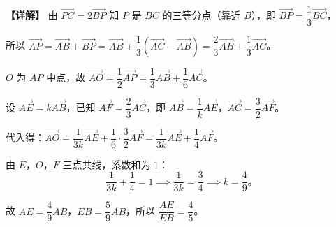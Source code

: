 \documentclass[UTF8,10pt,aspectratio=169]{ctexbeamer}
\begin{document}
	\begin{frame}
		\textbf{【详解】} 由 $\overrightarrow{PC} = 2\overrightarrow{BP}$ 知 $P$ 是 $BC$ 的三等分点（靠近 $B$），即 $\overrightarrow{BP} = \dfrac{1}{3}\overrightarrow{BC}$，
		
		\vspace{0.1cm}
		所以 $\overrightarrow{AP} = \overrightarrow{AB} + \overrightarrow{BP} = \overrightarrow{AB} + \dfrac{1}{3}(\overrightarrow{AC} - \overrightarrow{AB}) = \dfrac{2}{3}\overrightarrow{AB} + \dfrac{1}{3}\overrightarrow{AC}$。
		
		\vspace{0.2cm}
		$O$ 为 $AP$ 中点，故 $\overrightarrow{AO} = \dfrac{1}{2}\overrightarrow{AP} = \dfrac{1}{3}\overrightarrow{AB} + \dfrac{1}{6}\overrightarrow{AC}$。
		
		\vspace{0.2cm}
		设 $\overrightarrow{AE} = k\overrightarrow{AB}$，已知 $\overrightarrow{AF} = \dfrac{2}{3}\overrightarrow{AC}$，即 $\overrightarrow{AB} = \dfrac{1}{k}\overrightarrow{AE}$，$\overrightarrow{AC} = \dfrac{3}{2}\overrightarrow{AF}$。
		
		\vspace{0.1cm}
		代入得：$\overrightarrow{AO} = \dfrac{1}{3k}\overrightarrow{AE} + \dfrac{1}{6} \cdot \dfrac{3}{2}\overrightarrow{AF} = \dfrac{1}{3k}\overrightarrow{AE} + \dfrac{1}{4}\overrightarrow{AF}$。
		
		\vspace{0.2cm}
		由 $E$，$O$，$F$ 三点共线，系数和为 $1$：
		$$\dfrac{1}{3k} + \dfrac{1}{4} = 1 \implies \dfrac{1}{3k} = \dfrac{3}{4} \implies k = \dfrac{4}{9}。$$
		
		故 $AE = \dfrac{4}{9}AB$，$EB = \dfrac{5}{9}AB$，所以 $\dfrac{AE}{EB} = \dfrac{4}{5}$。
	\end{frame}
	
\end{document}
